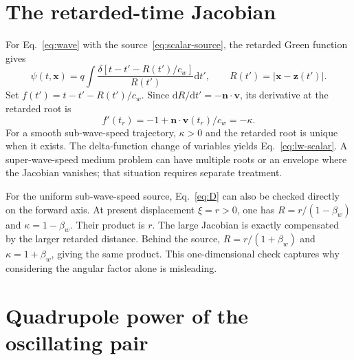 \documentclass[11pt,a4paper]{article}
\numberwithin{equation}{section}
\newcommand{\dd}{\mathrm{d}}
\begin{document}
\appendix
\section{The retarded-time Jacobian}
\label{app:jacobian}

For Eq.~\eqref{eq:wave} with the source~\eqref{eq:scalar-source}, the retarded Green function gives
\begin{equation}
 \psi(t,\bm x)=q\int\frac{
 \delta[t-t'-R(t')/c_w]}{R(t')}\dd t',
 \qquad R(t')=|\bm x-\bm z(t')|.
\end{equation}
Set $f(t')=t-t'-R(t')/c_w$. Since $\dd R/\dd t'=-\bm n\cdot\bm v$, its derivative at the retarded root is
\begin{equation}
 f'(t_r)=-1+\bm n\cdot\bm v(t_r)/c_w=-\kappa.
\end{equation}
For a smooth sub-wave-speed trajectory, $\kappa>0$ and the retarded root is unique when it exists. The delta-function change of variables yields Eq.~\eqref{eq:lw-scalar}. A super-wave-speed medium problem can have multiple roots or an envelope where the Jacobian vanishes; that situation requires separate treatment.

For the uniform sub-wave-speed source, Eq.~\eqref{eq:D} can also be checked directly on the forward axis. At present displacement $\xi=r>0$, one has $R=r/(1-\beta_w)$ and $\kappa=1-\beta_w$. Their product is $r$. The large Jacobian is exactly compensated by the larger retarded distance. Behind the source, $R=r/(1+\beta_w)$ and $\kappa=1+\beta_w$, giving the same product. This one-dimensional check captures why considering the angular factor alone is misleading.

\section{Quadrupole power of the oscillating pair}
\label{app:dumbbell}
\end{document}
